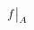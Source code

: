 \documentclass[10pt,a4paper]{article}
\newcommand\restr[2]{{%
		\left.\kern-\nulldelimiterspace %
		#1 %
		\vphantom{\big|} %
		\right|_{#2} %
	}}
\begin{document}
$\restr{f}{A}$
\end{document}
